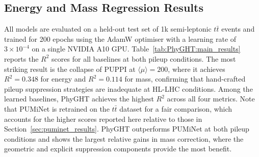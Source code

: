 \subsection{Energy and Mass Regression Results}

All models are evaluated on a held-out test set of 1k semi-leptonic $t\bar{t}$ events and trained for 200 epochs using the AdamW optimiser with a learning rate of $3\times10^{-4}$ on a single NVIDIA A10 GPU. 
Table~\ref{tab:PhyGHT:main_results} reports the $R^2$ scores for all baselines at both pileup conditions. 
The most striking result is the collapse of PUPPI at $\langle\mu\rangle=200$, where it achieves $R^2=0.348$ for energy and $R^2=0.114$ for mass, confirming that hand-crafted pileup suppression strategies are inadequate at HL-LHC conditions. 
Among the learned baselines, PhyGHT achieves the highest $R^2$ across all four metrics. 
Note that PUMiNet is retrained on the $t\bar{t}$ dataset for a fair comparison, which accounts for the higher scores reported here relative to those in Section~\ref{sec:puminet_results}. 
PhyGHT outperforms PUMiNet at both pileup conditions and shows the largest relative gains in mass correction, where the geometric and explicit suppression components provide the most benefit.

